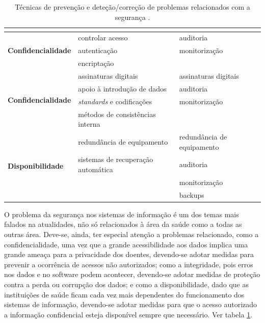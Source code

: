 \documentclass[conference]{IEEEtran}
\begin{document}
\begin{table}[!ht]
\centering
\caption{Técnicas de prevenção e deteção/correção de problemas relacionados com a segurança \cite{segurancaSI}.}
\label{tabl1}
\begin{adjustbox}{max width=\textwidth 	}
\begin{tabular}{ |l|l|l| }

\hline
	\multicolumn{1}{|c|}{\cellcolor[HTML]{EFEFEF}{\color[HTML]{333333}}}	&	\multicolumn{1}{|c|}{\cellcolor[HTML]{EFEFEF}{\color[HTML]{333333} \textbf{Prevenção}}}	&	\multicolumn{1}{|c|}{\cellcolor[HTML]{EFEFEF}{\color[HTML]{333333} \textbf{Deteção/Correção}}}	\\
\hline

\multirow{3}{*}{\textbf{Confidencialidade}}			&	controlar acesso					&	auditoria					\\
													&	autenticação						&	monitorização				\\
													&	encriptação							&								\\
\hline

\multirow{4}{*}{\textbf{Confidencialidade}}			&	assinaturas digitais				&	assinaturas digitais		\\
													&	apoio à introdução de dados			&	auditoria					\\
													&	\textit{standards} e codificações	&	monitorização				\\
													&	métodos de consistências interna	&								\\
\hline

\multirow{4}{*}{\textbf{Disponibilidade}}			&	redundância de equipamento			&	redundância de equipamento	\\
													&	sistemas de recuperação automática	&	auditoria					\\
													&										&	monitorização				\\
													&										&	backups 					\\
\hline

\end{tabular}
\end{adjustbox}
\end{table}

O problema da segurança nos sistemas de informação é um dos temas mais falados na atualidades, não só relacionados à área da saúde como a todas as outras área. Deve-se, ainda, ter especial atenção a problemas relacionado, como a confidencialidade, uma vez que a grande acessibilidade aos dados implica uma grande ameaça para a privacidade dos doentes, devendo-se adotar medidas para prevenir a ocorrência de acessos não autorizados; como a integridade, pois erros nos dados e no software podem acontecer, devendo-se adotar medidas de proteção contra a perda ou corrupção dos dados; e como a disponibilidade, dado que as instituições de saúde ficam cada vez mais dependentes do funcionamento dos sistemas de informação, devendo-se adotar medidas para que o acesso autorizado a informação confidencial esteja disponível sempre que necessário. Ver tabela \ref{tabl1}.
\end{document}
